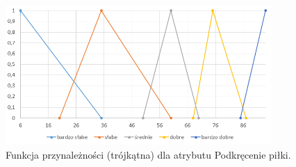 \documentclass{classrep}
\begin{document}
	\begin{figure}[h!]
		\centering
		\includegraphics[width=0.9\textwidth]{zmienne/7.png}
		\caption{Funkcja przynależności (trójkątna) dla atrybutu Podkręcenie piłki.}
		\label{wykresPodkrecenie}
	\end{figure}
	
	
	\newpage
\end{document}
